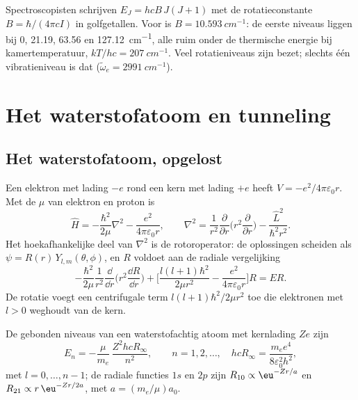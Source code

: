 \begin{example}\label{ex:b3:quantum-model-systems:hcl}
Spectroscopisten schrijven $E_J = hcB\,J(J+1)$ met de rotatieconstante $B =
\hbar/(4\pi cI)$ in golfgetallen. Voor  is $B = \qty{10.593}{cm^{-1}}$:
de eerste niveaus liggen bij 0, 21.19, 63.56 en \qty{127.12}{cm^{-1}}, alle
ruim onder de thermische energie bij kamertemperatuur, $kT/hc = \qty{207}{cm^{-1}}$.
Veel rotatieniveaus zijn bezet; slechts één vibratieniveau is dat
($\tilde\omega_e = \qty{2991}{cm^{-1}}$).
\end{example}

\section{Het waterstofatoom en tunneling}

\subsection*{Het waterstofatoom, opgelost}

Een elektron met lading $-e$ rond een kern met lading $+e$ heeft $V = -e^2/
4\pi\varepsilon_0r$. Met de  $\mu$ van elektron en proton is
\[
\hat H = -\frac{\hbar^2}{2\mu}\nabla^2 - \frac{e^2}{4\pi\varepsilon_0r},\qquad
\nabla^2 = \frac{1}{r^2}\frac{\partial}{\partial r}\Big(r^2\frac{\partial}{
\partial r}\Big) - \frac{\hat L^2}{\hbar^2r^2}.
\]
Het hoekafhankelijke deel van $\nabla^2$ is de rotoroperator: de
oplossingen
scheiden als $\psi = R(r)\,Y_{l,m}(\theta,\phi)$, en $R$ voldoet aan de
radiale vergelijking
\[
-\frac{\hbar^2}{2\mu}\frac{1}{r^2}\frac{\dd}{\dd r}\Big(r^2\frac{\dd R}{\dd r}
\Big) + \Big[\frac{l(l+1)\hbar^2}{2\mu r^2} - \frac{e^2}{4\pi\varepsilon_0r}
\Big]R = ER.
\]
De rotatie voegt een centrifugale term $l(l+1)\hbar^2/2\mu r^2$ toe die
elektronen met $l > 0$ weghoudt van de kern.

\begin{theorem}\label{thm:b3:quantum-model-systems:hydrogen}
De gebonden niveaus van een waterstofachtig atoom met kernlading $Ze$ zijn
\[
E_n = -\frac{\mu}{m_e}\,\frac{Z^2hcR_\infty}{n^2}, \qquad n = 1, 2, \dots,
\quad hcR_\infty = \frac{m_ee^4}{8\varepsilon_0^2h^2},
\]
met $l = 0, \dots, n - 1$; de radiale functies $1s$ en $2p$ zijn $R_{10}
\propto \eu^{-Zr/a}$ en $R_{21} \propto r\,\eu^{-Zr/2a}$, met $a =
(m_e/\mu)a_0$.
\end{theorem}

